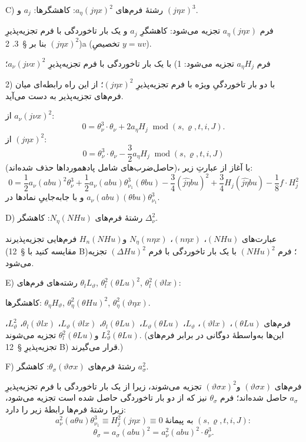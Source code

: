 \documentclass[11pt]{article}
\providecommand{\A}{\Delta}
\providecommand{\R}{\varrho}
\providecommand{\modu}[1]{\;\operatorname{mod} #1}
\begin{document}
\noindent C) رشتهٔ فرم‌های $a_\eta(j\eta x)^2$: کاهشگرها: $a_j$ و $(j\eta x)^3$.

فرم $a_\eta(j\eta x)$ تجزیه می‌شود: کاهشگرِ $a_j$ و یک بار تاخوردگی با فرم تجزیه‌پذیرِ $(j\eta x)^2$ بنا بر \S\ 3. 2)a (تخصیصِ $y=uv$).

فرم $a_\eta H_j$ تجزیه می‌شود: 1) با یک بار تاخوردگی با فرم تجزیه‌پذیرِ $a_\nu(j\nu x)^2$؛

2) با دو بار تاخوردگیِ ویژه با فرم تجزیه‌پذیرِ $(j\eta x)^2$؛ از این راه رابطه‌ای میان فرم‌های تجزیه‌پذیر به دست می‌آید.

از $a_\nu(j\nu x)^2$:
\[
0=\theta_\nu^3\cdot\theta_\nu+2a_\eta H_j\modu{(s,\R,t,i,J)}.
\]
از $(j\eta x)^2$:
\[
0=\theta_\nu^3\cdot\theta_\nu-\frac32a_\eta H_j\modu{(s,\R,t,i,J)}
\]
(حاصل‌ضرب‌های شامل پادهمورداها حذف شده‌اند)، با آغاز از عبارتِ زیر:
\[
0=\frac12a_\nu(abu)^2\theta_\nu^3
+\frac12a_\nu(abu)\theta_{\nu_1}^3(\theta bu)
-\frac34(\widehat{j\eta}bu)^2+\frac34H_j(\widehat{j\eta}bu)
-\frac18f\cdot H_j^2
\]
و با جابه‌جاییِ نمادها در $a_\nu(abu)(\theta bu)\theta_{\nu_1}^3$.

\noindent D) رشتهٔ فرم‌های $N_\eta(NHu)$: کاهشگر $\A_\nu^2$.

عبارت‌های $(NHu)$، $(n\eta x)$، $N_\eta(n\eta x)$ و$H_n(NHu)$ فرم‌هایی تجزیه‌پذیرند (مقایسه کنید با \S\ 12 B)؛ فرم $(NHu)^2$ با یک بار تاخوردگی با فرم $(\A Hu)^2$ تجزیه می‌شود.

\noindent E) رشته‌های فرم‌های $\theta_lL_\vartheta$, $\theta_l^2(\theta Lu)^2$, $\theta_l^2(\vartheta lx)$:

کاهشگرها: $\theta_\eta H_\vartheta$, $\theta_\eta^2(\theta Hu)^2$, $\theta_\eta^2(\vartheta\eta x)$.

فرم‌های $(\theta Lu)$، $(\vartheta lx)$، $L_\vartheta$، $L_\vartheta(\theta Lu)$، $\theta_l(\theta Lu)$، $L_\vartheta(\vartheta lx)$، $\theta_l(\vartheta lx)$، $L_\vartheta^2$، $L_\vartheta^2(\theta Lu)$ و$\theta_l^2(\theta Lu)$ تجزیه می‌شوند. (این‌ها به‌واسطهٔ دوگانی در برابر فرم‌های تجزیه‌پذیرِ \S\ 12 B) قرار می‌گیرند.)

\noindent F) رشتهٔ فرم‌های $\theta_\sigma(\vartheta\sigma x)$: کاهشگر $a_\sigma^2$.

فرم‌های $(\vartheta\sigma x)$ و$(\vartheta\sigma x)^2$ تجزیه می‌شوند، زیرا از یک بار تاخوردگی با فرم تجزیه‌پذیرِ $a_\sigma$ حاصل شده‌اند؛ فرم $\theta_\sigma$ نیز که از دو بار تاخوردگی حاصل شده است تجزیه می‌شود، زیرا رشتهٔ فرم‌ها رابطهٔ زیر را دارد:
\[
a_\nu^2(a\theta u)\theta_{\nu_1}^3\equiv H_j^2(j\eta x)\equiv0\;\text{به پیمانهٔ }(s,\R,t,i,J):
\]
\[
\theta_\sigma=a_\sigma(abu)^2=a_\nu^2(abu)^2\cdot\theta_\nu^3.
\]
\end{document}
